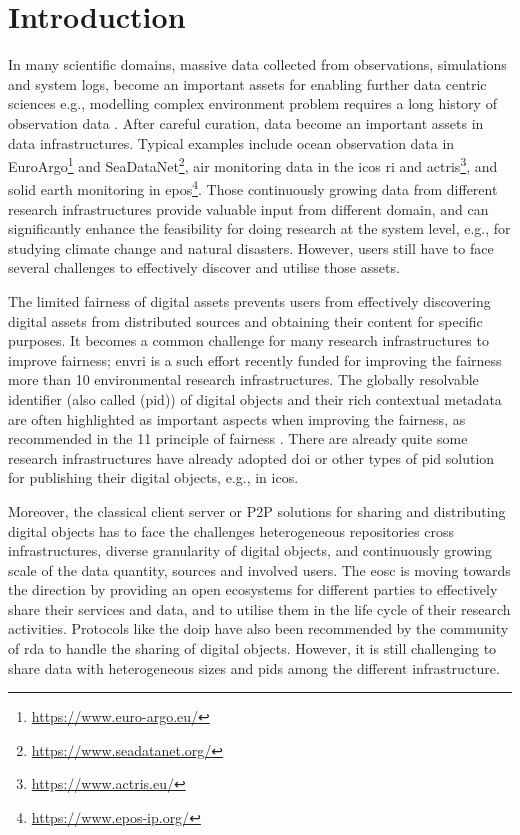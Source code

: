 \documentclass[conference]{IEEEtran}
\begin{document}
\section{Introduction}
In many scientific domains, massive data collected from observations, simulations and system logs, become an important assets for enabling further data centric sciences e.g., modelling complex environment problem requires a long history of observation data \cite{}. After careful curation, data become an important assets in data infrastructures. Typical examples include ocean observation data in EuroArgo\footnote{\url{https://www.euro-argo.eu/}} and SeaDataNet\footnote{\url{https://www.seadatanet.org/}}, air monitoring data in the \gls{icos} \gls{ri} and \gls{actris}\footnote{\url{https://www.actris.eu/}}, and solid earth monitoring in \gls{epos}\footnote{\url{https://www.epos-ip.org/}}. Those continuously growing data from different research infrastructures provide valuable input from different domain, and can significantly enhance the feasibility for doing research at the system level, e.g., for studying climate change and natural disasters. However, users still have to face several challenges to effectively discover and utilise those assets.

The limited \gls{fairness} of digital assets prevents users from effectively discovering digital assets from distributed sources and obtaining their content for specific purposes. It becomes a common challenge for many research infrastructures to improve \gls{fairness}; \gls{envri} is a such effort recently funded for improving the \gls{fairness} more than 10 environmental research infrastructures. The globally resolvable identifier (also called (\gls{pid})) of digital objects and their rich contextual metadata are often highlighted as important aspects when improving the \gls{fairness}, as recommended in the 11 principle of \gls{fairness} \cite{}. There are already quite some research infrastructures have already adopted \gls{doi} or other types of \gls{pid} solution for publishing their digital objects, e.g., in \gls{icos}.

Moreover, the classical client server or P2P solutions for sharing and distributing digital objects has to face the challenges heterogeneous repositories cross infrastructures, diverse granularity of digital objects, and continuously growing scale of the data quantity, sources and involved users. The \gls{eosc} is moving towards the direction by providing an open ecosystems for different parties to effectively share their services and data, and to utilise them in the life cycle of their research activities. Protocols like the \gls{doip} have also been recommended by the community of \gls{rda} to handle the sharing of digital objects. However, it is still challenging to share data with heterogeneous sizes and \glspl{pid} among the different infrastructure.
\end{document}
